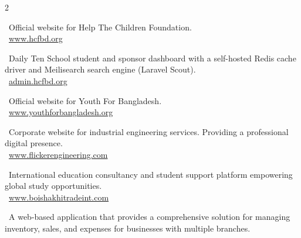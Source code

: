 
\begin{paracol}{2}


    \small \faChevronRight \ Official website for Help The Children Foundation. \\[0.5em]
    \small \faGlobe \ \href{https://www.hcfbd.org}{www.hcfbd.org}

    \divider

    \small \faChevronRight \ Daily Ten School student and sponsor dashboard with a self-hosted Redis cache driver and Meilisearch search engine (Laravel Scout). \\[0.5em]
    \small \faGlobe \ \href{https://admin.hcfbd.org}{admin.hcfbd.org}

    \divider

    \small \faChevronRight \ Official website for Youth For Bangladesh. \\[0.5em]
    \small \faGlobe \ \href{https://www.youthforbangladesh.org}{www.youthforbangladesh.org}

    \divider

    \small \faChevronRight \ Corporate website for industrial engineering services. Providing a professional digital presence. \\[0.5em]
    \small \faGlobe \ \href{https://www.flickerengineering.com}{www.flickerengineering.com}

    \divider

    \small \faChevronRight \ International education consultancy and student support platform empowering global study opportunities. \\[0.5em]
    \small \faGlobe \ \href{https://www.boishakhitradeint.com}{www.boishakhitradeint.com}

    \divider

    \small \faChevronRight \ A web-based application that provides a comprehensive solution for managing inventory, sales, and expenses for businesses with multiple branches.


\end{paracol}
